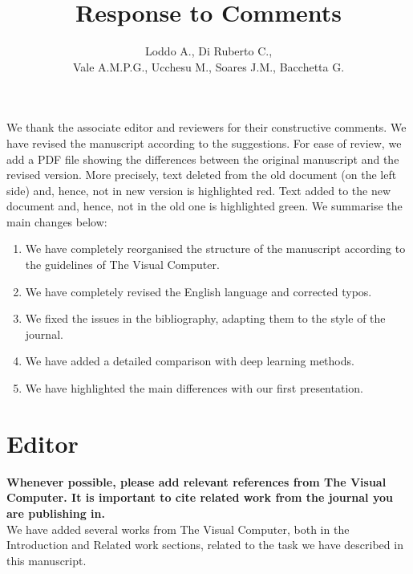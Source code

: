 \documentclass[]{article}
\title{Response to Comments}
\author{Loddo A., Di Ruberto C., \\Vale A.M.P.G.,	Ucchesu M.,	Soares J.M., Bacchetta G.}
\begin{document}
	
	\maketitle
	
	We thank the associate editor and reviewers for their constructive comments. 
	We have revised the manuscript according to the suggestions.
	For ease of review, we add a PDF file showing the differences between the original manuscript and the revised version. More precisely, text deleted from the old document (on the left side) and, hence, not in new version is highlighted red. Text added to the new document and, hence, not in the old one is highlighted green.
	We summarise the main changes below:
	\\
	\begin{enumerate}
		\item We have completely reorganised the structure of the manuscript according to the guidelines of The Visual Computer. \\
		\item We have completely revised the English language and corrected typos. \\
		\item We fixed the issues in the bibliography, adapting them to the style of the journal. \\
		\item We have added a detailed comparison with deep learning methods. \\
		\item We have highlighted the main differences with our first presentation. \\
	\end{enumerate}
	
	\section{Editor}
	\textbf{Whenever possible, please add relevant references from The Visual Computer. It is important to cite related work from the journal you are publishing in.} \\
	
	We have added several works from The Visual Computer, both in the Introduction and Related work sections, related to the task we have described in this manuscript.
	
\end{document}
